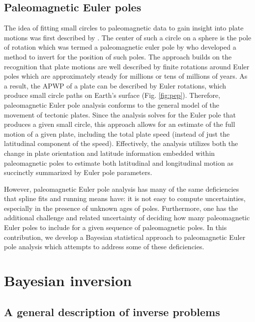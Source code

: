 \documentclass[11pt,letterpaper]{article}
\begin{document}
\subsection*{Paleomagnetic Euler poles}
The idea of fitting small circles to paleomagnetic data to gain insight into plate motions was first described by \cite{Francheteau1969a}. The center of such a circle on a sphere is the pole of rotation which was termed a paleomagnetic euler pole by \cite{Gordon1984a} who developed a method to invert for the position of such poles. The approach builds on the recognition that plate motions are well described by finite rotations around Euler poles which are approximately steady for millions or tens of millions of years. As a result, the APWP of a plate can be described by Euler rotations, which produce small circle paths on Earth's surface (Fig. \ref{fig:pep}). Therefore, paleomagnetic Euler pole analysis conforms to the general model of the movement of tectonic plates. Since the analysis solves for the Euler pole that produces a given small circle, this approach allows for an estimate of the full motion of a given plate, including the total plate speed (instead of just the latitudinal component of the speed). Effectively, the analysis utilizes both the change in plate orientation and latitude information embedded within paleomagnetic poles to estimate both latitudinal and longitudinal motion as succinctly summarized by Euler pole parameters.

However, paleomagnetic Euler pole analysis has many of the same deficiencies that spline fits and running means have: it is not easy to compute uncertainties, especially in the presence of unknown ages of poles. Furthermore, one has the additional challenge and related uncertainty of deciding how many paleomagnetic Euler poles to include for a given sequence of paleomagnetic poles. In this contribution, we develop a Bayesian statistical approach to paleomagnetic Euler pole analysis which attempts to address some of these deficiencies.

\section*{Bayesian inversion}
\subsection*{A general description of inverse problems}
\end{document}
